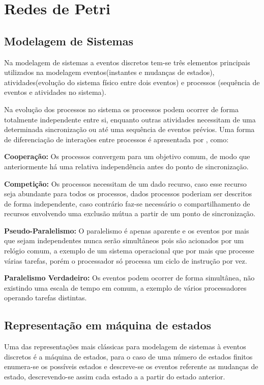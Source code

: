 \chapter{Redes de Petri}

\section{Modelagem de Sistemas}
Na modelagem de sistemas a eventos discretos tem-se três elementos principais utilizados na modelagem eventos(instantes e mudanças de estados), atividades(evolução do sistema físico entre dois eventos) e processos (sequência de eventos e atividades no sistema). 

Na evolução dos processos no sistema os processos podem ocorrer de forma totalmente independente entre si, enquanto outras atividades necessitam de uma determinada sincronização ou até uma sequência de eventos prévios. Uma forma de diferenciação de interações entre processos é apresentada por \cite{vallete}, como:

\textbf{Cooperação:} Os processos convergem para um objetivo comum, de modo que anteriormente há uma relativa independência antes do ponto de sincronização.

\textbf{Competição:} Os processos necessitam de um dado recurso, caso esse recurso seja abundante para todos os processos, dados processos poderiam ser descritos de forma independente, caso contrário faz-se necessário o compartilhamento de recursos envolvendo uma exclusão mútua a partir de um ponto de sincronização.

\textbf{Pseudo-Paralelismo:} O paralelismo é apenas aparente e os eventos por mais que sejam independentes nunca serão simultâneos pois são acionados por um relógio comum, a exemplo de um sistema operacional que por mais que processe várias tarefas, porém o processador só processa um ciclo de instrução por vez.

\textbf{Paralelismo Verdadeiro:} Os eventos podem ocorrer de forma simultânea, não existindo uma escala de tempo em comum, a exemplo de vários processadores operando tarefas distintas.

\section{Representação em máquina de estados}
Uma das representações mais clássicas para modelagem de sistemas à eventos discretos é a máquina de estados, para o caso de uma número de estados finitos enumera-se os possíveis estados e descreve-se os eventos referente as mudanças de estado, descrevendo-se assim cada estado a a partir do estado anterior.

